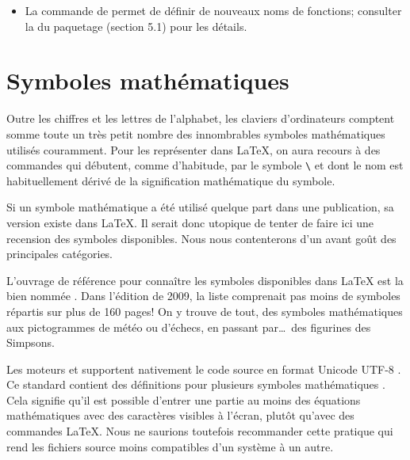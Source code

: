 \begin{itemize}
\begin{demo}
\begin{texinput}{0.48\linewidth}
\begin{lstlisting}
% hors paragraphe
\lim_{x \to 0} x = 0
\end{lstlisting}
    \end{texinput}
    \hfill
    \begin{texoutput}{0.48\linewidth}
      $\displaystyle \lim_{x \to 0} x = 0$
    \end{texoutput}
  \end{demo}
\item La commande \cmd{\DeclareMathOperator} de  permet
  de définir de nouveaux noms de fonctions; consulter la %
  du paquetage (section 5.1) pour les détails.
\end{itemize}



\section{Symboles mathématiques}
\label{sec:math:symboles}

Outre les chiffres et les lettres de l'alphabet, les claviers
d'ordinateurs comptent somme toute un très petit nombre des
innombrables symboles mathématiques utilisés couramment. Pour les
représenter dans {\LaTeX}, on aura recours à des commandes qui
débutent, comme d'habitude, par le symbole \verb=\= et dont le nom est
habituellement dérivé de la signification mathématique du symbole.

Si un symbole mathématique a été utilisé quelque part dans une
publication, sa version existe dans {\LaTeX}. Il serait donc utopique
de tenter de faire ici une recension des symboles disponibles. Nous
nous contenterons d'un avant goût des principales catégories.

L'ouvrage de référence pour connaître les symboles disponibles dans
{\LaTeX} est la bien nommée %
. %
Dans l'édition de 2009, la liste comprenait pas moins de 
symboles répartis sur plus de 160 pages! On y trouve de tout, des
symboles mathématiques aux pictogrammes de météo ou d'échecs, en
passant par\dots\ des figurines des Simpsons.

\begin{important}
  Les moteurs {\XeTeX} et {\LuaTeX} supportent nativement le code
  source en format Unicode UTF-8 \citep{Unicode:5.0}. Ce standard
  contient des définitions pour plusieurs symboles mathématiques
  \citep{wikipedia:unicode-math}. Cela signifie qu'il est possible
  d'entrer une partie au moins des équations mathématiques avec des
  caractères visibles à l'écran, plutôt qu'avec des commandes {\LaTeX}.
  Nous ne saurions toutefois recommander cette pratique qui rend les
  fichiers source moins compatibles d'un système à un autre.
\end{important}


